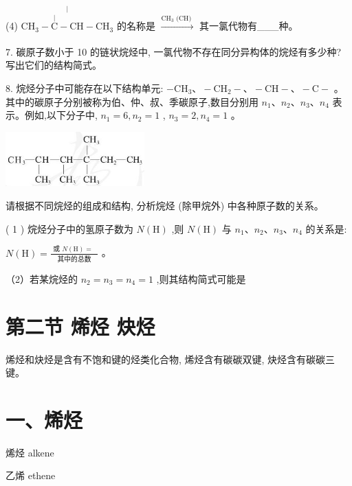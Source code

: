 \documentclass[10pt]{article}
\begin{document}
(4) \({\mathrm{{CH}}}_{3} - \overset{|}{\overset{|}{\mathrm{C}} - \mathrm{{CH}}} - {\mathrm{{CH}}}_{3}\) 的名称是 \(\xrightarrow[]{{\mathrm{{CH}}}_{3}\text{ (CH) }}\) 其一氯代物有\_\_\_种。

7. 碳原子数小于 10 的链状烷烃中, 一氯代物不存在同分异构体的烷烃有多少种? 写出它们的结构简式。

8. 烷烃分子中可能存在以下结构单元: \(- {\mathrm{{CH}}}_{3}\text{、} - {\mathrm{{CH}}}_{2} - \text{、} - \mathrm{{CH}} - \text{、} - \mathrm{C} -\) 。其中的碳原子分别被称为伯、仲、叔、季碳原子,数目分别用 \({n}_{1}\text{、}{n}_{2}\text{、}{n}_{3}\text{、}{n}_{4}\) 表示。例如,以下分子中, \({n}_{1} = 6,{n}_{2} = 1\) , \({n}_{3} = 2,{n}_{4} = 1\) 。

\begin{center}
\includegraphics[max width=0.4\textwidth]{images/0190efc5-b58a-7c43-bfb0-e0a030df9cfd_38_330857.jpg}
\end{center}

请根据不同烷烃的组成和结构, 分析烷烃 (除甲烷外) 中各种原子数的关系。

( 1 ) 烷烃分子中的氢原子数为 \(N\left( \mathrm{H}\right)\) ,则 \(N\left( \mathrm{H}\right)\) 与 \({n}_{1}\text{、}{n}_{2}\text{、}{n}_{3}\text{、}{n}_{4}\) 的关系是:

\(N\left( \mathrm{H}\right) = \frac{\text{ 或 }N\left( \mathrm{H}\right) = \text{ }}{\text{ 其中的总数 }}\) 。

（2）若某烷烃的 \({n}_{2} = {n}_{3} = {n}_{4} = 1\) ,则其结构简式可能是

\section*{第二节 烯烃 炔烃}

烯烃和炔烃是含有不饱和键的烃类化合物, 烯烃含有碳碳双键, 炔烃含有碳碳三键。

\section*{一、烯烃}

\begin{mdframed}

烯烃 alkene

乙烯 ethene

\end{mdframed}
\end{document}
